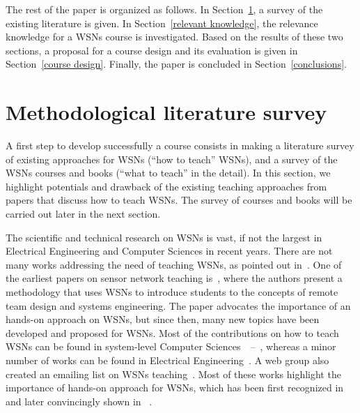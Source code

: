 \documentclass[onecolumn,12pt,draftclsnofoot,a4paper,peerreview]{IEEEtran}
\begin{document}
The rest of the paper is organized as follows. In Section~\ref{literature}, a survey of the existing literature is given. In Section~\ref{relevant knowledge}, the relevance knowledge for a WSNs course is investigated. Based on the results of these two sections, a proposal for a course design and its evaluation is given in Section~\ref{course design}. Finally, the paper is concluded in Section~\ref{conclusions}. 



\section{Methodological literature survey} \label{literature}


A first step to develop successfully a course consists in making a literature survey of existing approaches for WSNs (``how to teach'' WSNs), and a survey of the WSNs courses and books (``what to teach'' in the detail). In this section, we highlight potentials and drawback of the existing teaching approaches from papers that discuss how to teach WSNs. The survey of courses and books will be carried out later in the next section. 

The scientific and technical research on WSNs is vast, if not the largest in Electrical Engineering and Computer Sciences in recent years. There are not many works  addressing the need of teaching WSNs, as pointed out in~\cite{Rollins11}. One of the earliest papers on sensor network teaching is~\cite{1013877}, where the authors present a methodology that uses WSNs to introduce students to the concepts of remote team design and systems engineering. The paper advocates the importance of an hands-on approach on WSNs, but since then, many new topics have been developed and proposed for WSNs. Most of the contributions on how to teach WSNs can be found in system-level Computer Sciences~\cite{Rollins11}~--\nocite{Feonster+09,Tyman+09,Feonster+10,Zennaro+12,6375774}~\cite{5598548}, whereas a minor number of works can be found in Electrical Engineering~\cite{Taslidere+11,4909475}. A web group also created an emailing list on WSNs teaching~\cite{teaching-sensornet-website}. Most of these works highlight the importance of hands-on approach for WSNs, which has been first recognized in~\cite{1013877} and later convincingly shown in \cite{Feonster+09} \nocite{Tyman+09}~\cite{Feonster+10}.
\end{document}

